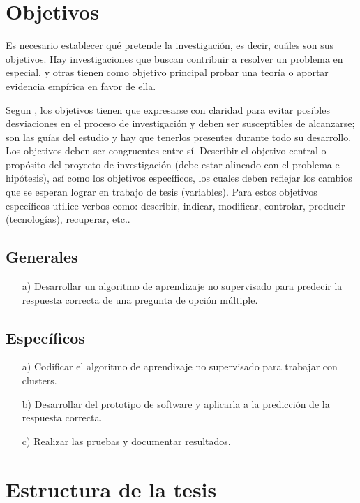 \section{Objetivos}
Es necesario establecer qué pretende la investigación, es decir, cuáles son sus objetivos. Hay investigaciones que buscan contribuir a resolver un problema en especial, y otras tienen como objetivo principal probar una teoría o aportar evidencia empírica en favor de ella. \par 
\vskip 0.3cm
Segun \cite{Rojas}, los objetivos tienen que expresarse con claridad para evitar posibles desviaciones en el proceso de investigación y deben ser susceptibles de alcanzarse; son las guías del estudio y hay que tenerlos presentes durante todo su desarrollo. Los objetivos deben ser congruentes entre sí.
\vskip 0.3cm
Describir el objetivo central o propósito del proyecto de investigación (debe estar alineado con el problema e hipótesis), así como los objetivos específicos, los cuales deben reflejar los cambios que se esperan lograr en trabajo de tesis (variables). Para estos objetivos específicos utilice verbos como: describir, indicar, modificar, controlar, producir (tecnologías), recuperar, etc..

\subsection{Generales}
\begin{enumerate}
\item[a)] Desarrollar un algoritmo de aprendizaje no supervisado para predecir la respuesta correcta de una pregunta de opción múltiple.
\end{enumerate}


\subsection{Específicos}
\begin{enumerate}
\item[a)] Codificar el algoritmo de aprendizaje no supervisado para trabajar con clusters.
\item[b)] Desarrollar del prototipo de software y aplicarla a la predicción de la respuesta correcta.
\item[c)] Realizar las pruebas y documentar resultados.
\end{enumerate}
\vskip 0.3cm


\section{Estructura de la tesis}

